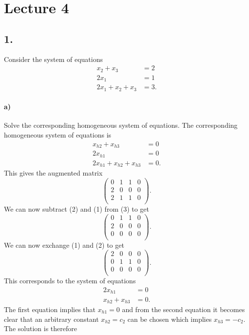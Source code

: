 \section*{Lecture 4}

\subsection*{1.}
Consider the system of equations
\begin{align*}
  x_2 + x_3 &= 2 \\
  2x_1 &= 1 \\
  2x_1 + x_2 + x_3 &= 3
.\end{align*}

\paragraph{a)} Solve the corresponding homogeneous system of equations.
\bigbreak
The corresponding homogeneous system of equations is
\begin{align*}
  x_{h2} + x_{h3} &= 0 \\
  2x_{h1} &= 0 \\
  2x_{h1} + x_{h2} + x_{h3} &= 0
.\end{align*}
This gives the augmented matrix
\[ 
\left( \begin{array}{ccc|c}
0 & 1 & 1 & 0\\
2 & 0 & 0 & 0\\
2 & 1 & 1 & 0\\
\end{array} \right)
.\]
We can now subtract (2) and (1) from (3) to get
\[ 
\left( \begin{array}{ccc|c}
0 & 1 & 1 & 0\\
2 & 0 & 0 & 0\\
0 & 0 & 0 & 0\\
\end{array} \right)
.\]
We can now exchange (1) and (2) to get
\[ 
\left( \begin{array}{ccc|c}
2 & 0 & 0 & 0\\
0 & 1 & 1 & 0\\
0 & 0 & 0 & 0\\
\end{array} \right)
.\]
This corresponds to the system of equations
\begin{align*}
  2x_{h1} &= 0 \\
  x_{h2} + x_{h3} &= 0
.\end{align*} 
The first equation implies that $x_{h1} = 0$ and from the second equation it becomes clear that an arbitrary constant $x_{h2} = c_2$ can be chosen which implies $x_{h3} = -c_2$. The solution is therefore
